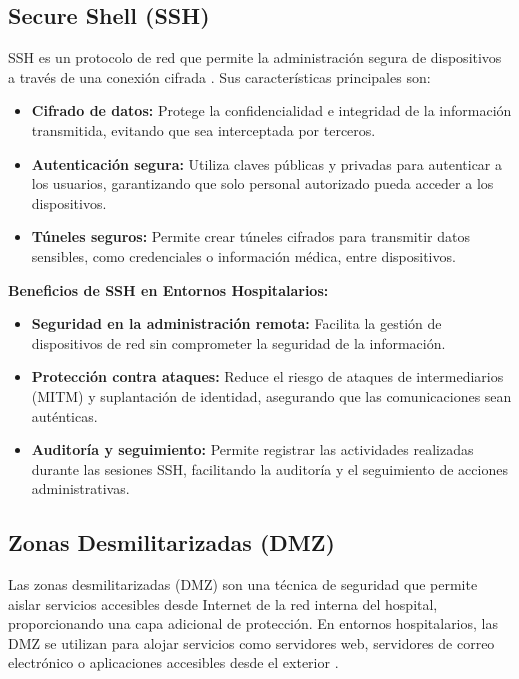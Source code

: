 \subsection{Secure Shell (SSH)}
\label{subsec:ssh}
SSH es un protocolo de red que permite la administración segura de dispositivos a través de una conexión cifrada \cite{cisco-hospital-design}. Sus características principales son:
\begin{itemize}
    \item \textbf{Cifrado de datos:} Protege la confidencialidad e integridad de la información transmitida, evitando que sea interceptada por terceros.
    \item \textbf{Autenticación segura:} Utiliza claves públicas y privadas para autenticar a los usuarios, garantizando que solo personal autorizado pueda acceder a los dispositivos.
    \item \textbf{Túneles seguros:} Permite crear túneles cifrados para transmitir datos sensibles, como credenciales o información médica, entre dispositivos.
\end{itemize}
\textbf{Beneficios de SSH en Entornos Hospitalarios:}
\begin{itemize}
    \item \textbf{Seguridad en la administración remota:} Facilita la gestión de dispositivos de red sin comprometer la seguridad de la información.
    \item \textbf{Protección contra ataques:} Reduce el riesgo de ataques de intermediarios (\ac{MITM}) y suplantación de identidad, asegurando que las comunicaciones sean auténticas.
    \item \textbf{Auditoría y seguimiento:} Permite registrar las actividades realizadas durante las sesiones SSH, facilitando la auditoría y el seguimiento de acciones administrativas.
\end{itemize}

\subsection{Zonas Desmilitarizadas (DMZ)}
Las zonas desmilitarizadas (DMZ) son una técnica de seguridad que permite aislar servicios accesibles desde Internet de la red interna del hospital, proporcionando una capa adicional de protección.
En entornos hospitalarios, las DMZ se utilizan para alojar servicios como servidores web, servidores de correo electrónico o aplicaciones accesibles desde el exterior \cite{cisco-hospital-design}.

